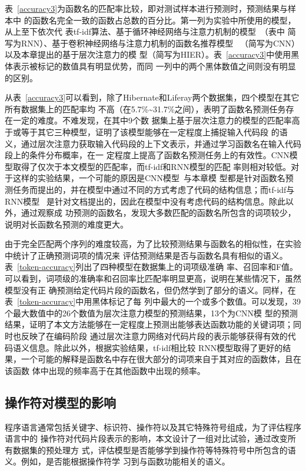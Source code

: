 表~\ref{accuracy3}为函数名的匹配率比较，即对测试样本进行预测时，预测结果与样本中
的函数名完全一致的函数占总数的百分比。第一列为实验中所使用的模型，从上至下依次代
表tf-idf算法、基于循环神经网络与注意力机制的模型~\cite{bahdanau2015neural}（表中
简写为RNN）、基于卷积神经网络与注意力机制的函数名推荐模型
~\cite{allamanis2016convolutional}（简写为CNN）以及本章提出的基于层次注意力的模
型（简写为HIER）。表~\ref{accuracy3}中使用黑体表示被标记的数值具有明显优势，而同
一列中的两个黑体数值之间则没有明显的区别。

从表~\ref{accuracy3}可以看到，除了Hibernate和Liferay两个数据集，四个模型在其它所有数据集上的匹配率均
不高（在5.7\%\textasciitilde31.7\%之间），表明了函数名预测任务存在一定的难度。不难发现，在其中9个数
据集上基于层次注意力的模型的匹配率高于或等于其它三种模型，证明了该模型能够在一定程度上捕捉输入代码段
的语义，通过层次注意力获取输入代码段的上下文表示，并通过学习函数名在输入代码段上的条件分布概率，在一
定程度上提高了函数名预测任务上的有效性。CNN模型取得了仅次于本文模型的匹配率，而tf-idf和RNN模型的匹配
率则相对较低。对于这样的实验结果，一个可能的原因是CNN模型~\cite{allamanis2016convolutional}与本章模
型都是针对函数名预测任务而提出的，并在模型中通过不同的方式考虑了代码的结构信息；而tf-idf与RNN模型
~\cite{bahdanau2015neural}是针对文档提出的，因此在模型中没有考虑代码的结构信息。除此以外，通过观察成
功预测的函数名，发现大多数匹配的函数名所包含的词项较少，说明对长函数名预测的难度更大。

由于完全匹配两个序列的难度较高，为了比较预测结果与函数名的相似性，在实验中统计了正确预测词项的情况来
评估预测结果是否与函数名具有相似的语义。表~\ref{token-accuracy}列出了四种模型在数据集上的词项级准确
率、召回率和F值。可以看到，词项级的准确率和召回率比匹配率明显更高，说明在某些情况下，虽然模型没有正
确预测给定代码片段的函数名，但仍然学到了部分的语义。同样，在表~\ref{token-accuracy}中用黑体标记了每
列中最大的一个或多个数值。可以发现，39个最大数值中的26个数值为层次注意力模型的预测结果，13个为CNN模
型的预测结果，证明了本文方法能够在一定程度上预测出能够表达函数功能的关键词项；同时也反映了在编码阶段
通过层次注意力网络对代码片段的表示能够获得有效的代码语义信息。除此以外，根据实验结果，tf-idf相比较
RNN模型取得了更好的结果，一个可能的解释是函数名中存在很大部分的词项来自于其对应的函数体，且在该函数
体中出现的频率高于在其他函数中出现的频率。

\subsection{操作符对模型的影响}
程序语言通常包括关键字、标识符、操作符以及其它特殊符号组成，为了评估程序语言中的
操作符对代码片段表示的影响，本文设计了一组对比试验，通过改变所有数据集的预处理方
式，评估模型是否能够学到操作符等特殊符号中所包含的语义。例如，是否能根据操作符学
习到与函数功能相关的语义。


